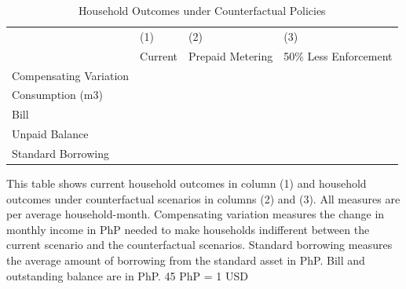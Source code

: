 \documentclass[12pt,table]{article}
\begin{document}
\begin{table}[H]
\centering
\caption{Household Outcomes under Counterfactual Policies}\label{table:counter}
\begin{threeparttable}
\begin{tabular}{@{}l*{1}{EEE}@{}}
\toprule
 & (1)    & (2)          & (3)   \\
 & Current & Prepaid Metering & 50\% Less Enforcement   \\
\midrule
Compensating Variation &   &   &   \\
Consumption (m3)	 &    &     &   \\
Bill			 &    &     &   \\
Unpaid Balance &  &     &    \\
Standard Borrowing &  &     &    \\
\bottomrule
\end{tabular}
\begin{tablenotes}
\item 
\footnotesize 
This table shows current household outcomes in column (1) and household outcomes under counterfactual scenarios in columns (2) and (3).  All measures are per average household-month. Compensating variation measures the change in monthly income in PhP needed to make households indifferent between the current scenario and the counterfactual scenarios.  Standard borrowing measures the average amount of borrowing from the standard asset in PhP.  Bill and outstanding balance are in PhP.    45 PhP = 1 USD
\end{tablenotes}
\end{threeparttable}
\end{table}
\end{document}
